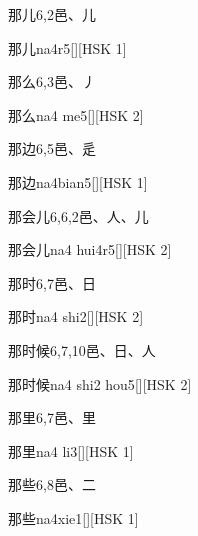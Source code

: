 \begin{entry}{那儿}{6,2}{⾢、⼉}
  \begin{phonetics}{那儿}{na4r5}[][HSK 1]
  \end{phonetics}
\end{entry}

\begin{entry}{那么}{6,3}{⾢、⼃}
  \begin{phonetics}{那么}{na4 me5}[][HSK 2]
  \end{phonetics}
\end{entry}

\begin{entry}{那边}{6,5}{⾢、⾡}
  \begin{phonetics}{那边}{na4bian5}[][HSK 1]
  \end{phonetics}
\end{entry}

\begin{entry}{那会儿}{6,6,2}{⾢、⼈、⼉}
  \begin{phonetics}{那会儿}{na4 hui4r5}[][HSK 2]
  \end{phonetics}
\end{entry}

\begin{entry}{那时}{6,7}{⾢、⽇}
  \begin{phonetics}{那时}{na4 shi2}[][HSK 2]
  \end{phonetics}
\end{entry}

\begin{entry}{那时候}{6,7,10}{⾢、⽇、⼈}
  \begin{phonetics}{那时候}{na4 shi2 hou5}[][HSK 2]
  \end{phonetics}
\end{entry}

\begin{entry}{那里}{6,7}{⾢、⾥}
  \begin{phonetics}{那里}{na4 li3}[][HSK 1]
  \end{phonetics}
\end{entry}

\begin{entry}{那些}{6,8}{⾢、⼆}
  \begin{phonetics}{那些}{na4xie1}[][HSK 1]
  \end{phonetics}
\end{entry}

